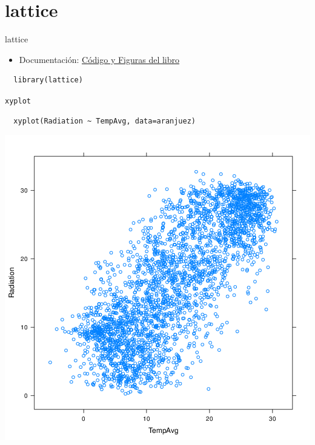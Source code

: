 \documentclass[xcolor={usenames,svgnames,dvipsnames}]{beamer}
\begin{document}
\section{lattice}
\label{sec:orgheadline63}

\begin{frame}[fragile,label={sec:orgheadline8}]{lattice}
 \begin{itemize}
\item Documentación: \href{http://lmdvr.r-forge.r-project.org/figures/figures.html}{Código y Figuras del libro}
\end{itemize}

\lstset{language=R,label= ,caption= ,captionpos=b,numbers=none}
\begin{lstlisting}
  library(lattice)
\end{lstlisting}
\end{frame}

\begin{frame}[fragile,label={sec:orgheadline9}]{\texttt{xyplot}}
 \lstset{language=R,label= ,caption= ,captionpos=b,numbers=none}
\begin{lstlisting}
  xyplot(Radiation ~ TempAvg, data=aranjuez)
\end{lstlisting}
\end{frame}

\begin{frame}[label={sec:orgheadline10}]{}
\includegraphics[width=.9\linewidth]{figs/xyplot.png}
\end{frame}
\end{document}
